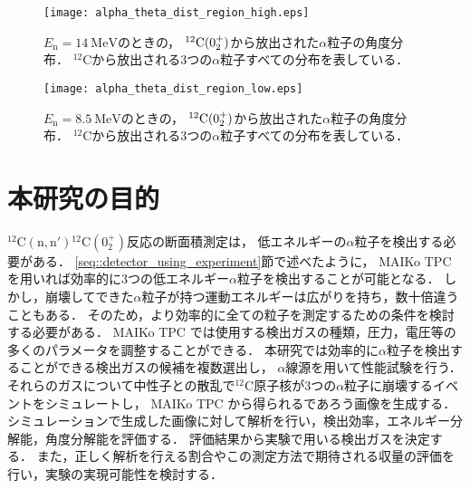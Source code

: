 \documentclass[../master]{subfiles}
\begin{document}
\begin{figure}
  \centering
  \texttt{[image: alpha\_theta\_dist\_region\_high.eps]}
  \caption[${}^{12}{\rm C} (0_2^+)$から放出された$\alpha$粒子の角度分布．]
          {$E_{\mathrm{n}}=\SI{14}{\mega\electronvolt}$のときの，
            ${}^{12}{\rm C} (0_2^+)$から放出された$\alpha$粒子の角度分布．
            ${}^{12}\mathrm{C}$から放出される3つの$\alpha$粒子すべての分布を表している．
          }
  \label{fig::alpha_theta_dist_high}
\end{figure}
\begin{figure}
  \centering
  \texttt{[image: alpha\_theta\_dist\_region\_low.eps]}
  \caption[${}^{12}{\rm C} (0_2^+)l$から放出された$\alpha$粒子の角度分布．]
          {$E_{\mathrm{n}}=\SI{8.5}{\mega\electronvolt}$のときの，
            ${}^{12}{\rm C} (0_2^+)$から放出された$\alpha$粒子の角度分布．
            ${}^{12}\mathrm{C}$から放出される3つの$\alpha$粒子すべての分布を表している．
          }
  \label{fig::alpha_theta_dist_low}
\end{figure}


\section{本研究の目的}
${}^{12}\mathrm{C}(\mathrm{n},\mathrm{n}'){}^{12}\mathrm{C} (0_2^+)$反応の断面積測定は，
低エネルギーの$\alpha$粒子を検出する必要がある．
\ref{seq::detector_using_experiment}節で述べたように，
MAIKo TPC を用いれば効率的に3つの低エネルギー$\alpha$粒子を検出することが可能となる．
しかし，崩壊してできた$\alpha$粒子が持つ運動エネルギーは広がりを持ち，数十倍違うこともある．
そのため，より効率的に全ての粒子を測定するための条件を検討する必要がある．
MAIKo TPC では使用する検出ガスの種類，圧力，電圧等の多くのパラメータを調整することができる．
本研究では効率的に$\alpha$粒子を検出することができる検出ガスの候補を複数選出し，
$\alpha$線源を用いて性能試験を行う．
それらのガスについて中性子との散乱で${}^{12}\mathrm{C}$原子核が3つの$\alpha$粒子に崩壊するイベントをシミュレートし，
MAIKo TPC から得られるであろう画像を生成する．
シミュレーションで生成した画像に対して解析を行い，検出効率，エネルギー分解能，角度分解能を評価する．
評価結果から実験で用いる検出ガスを決定する．
また，正しく解析を行える割合やこの測定方法で期待される収量の評価を行い，実験の実現可能性を検討する．
\end{document}
